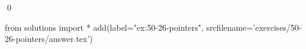 
\begin{ex}
  \label{ex:50-26-pointers}
  
  \qed
\end{ex}
\begin{python0}
from solutions import *
add(label="ex:50-26-pointers",
    srcfilename='exercises/50-26-pointers/answer.tex')
\end{python0}
